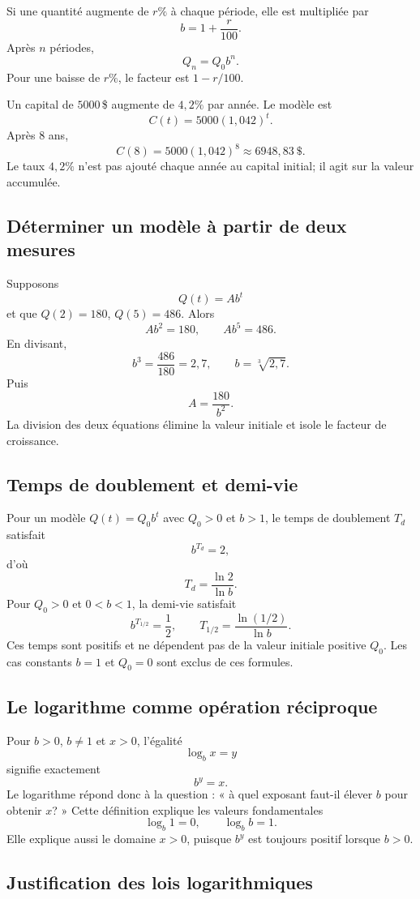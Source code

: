 Si une quantité augmente de $r\%$ à chaque période, elle est multipliée par
\[
b=1+\frac r{100}.
\]
Après $n$ périodes,
\[
Q_n=Q_0b^n.
\]
Pour une baisse de $r\%$, le facteur est $1-r/100$.

\begin{examplebox}
Un capital de $5000\,$\$ augmente de $4{,}2\%$ par année. Le modèle est
\[
C(t)=5000(1{,}042)^t.
\]
Après $8$ ans,
\[
C(8)=5000(1{,}042)^8\approx6948{,}83\ \$.
\]
Le taux $4{,}2\%$ n'est pas ajouté chaque année au capital initial; il agit sur la valeur accumulée.
\end{examplebox}

\subsection{Déterminer un modèle à partir de deux mesures}

Supposons
\[
Q(t)=Ab^t
\]
et que $Q(2)=180$, $Q(5)=486$. Alors
\[
Ab^2=180,
\qquad
Ab^5=486.
\]
En divisant,
\[
b^3=\frac{486}{180}=2{,}7,
\qquad
b=\sqrt[3]{2{,}7}.
\]
Puis
\[
A=\frac{180}{b^2}.
\]
La division des deux équations élimine la valeur initiale et isole le facteur de croissance.

\subsection{Temps de doublement et demi-vie}

Pour un modèle $Q(t)=Q_0b^t$ avec $Q_0>0$ et $b>1$, le temps de doublement $T_d$ satisfait
\[
b^{T_d}=2,
\]
d'où
\[
T_d=\frac{\ln2}{\ln b}.
\]
Pour $Q_0>0$ et $0<b<1$, la demi-vie satisfait
\[
b^{T_{1/2}}=\frac12,
\qquad
T_{1/2}=\frac{\ln(1/2)}{\ln b}.
\]
Ces temps sont positifs et ne dépendent pas de la valeur initiale positive $Q_0$. Les cas constants $b=1$ et $Q_0=0$ sont exclus de ces formules.

\subsection{Le logarithme comme opération réciproque}

Pour $b>0$, $b\ne1$ et $x>0$, l'égalité
\[
\log_bx=y
\]
signifie exactement
\[
b^y=x.
\]
Le logarithme répond donc à la question : « à quel exposant faut-il élever $b$ pour obtenir $x$? » Cette définition explique les valeurs fondamentales
\[
\log_b1=0,
\qquad
\log_bb=1.
\]
Elle explique aussi le domaine $x>0$, puisque $b^y$ est toujours positif lorsque $b>0$.

\subsection{Justification des lois logarithmiques}

